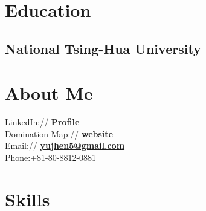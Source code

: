 \documentclass[letterpaper]{deedy-resume} %
\begin{document}


\begin{minipage}[t]{0.33\textwidth} %


\section{Education} 

\subsection{National Tsing-Hua University}


\sectionspace %


\section{About Me} 

LinkedIn:// \href{https://www.linkedin.com/in/yuzhen-xie-098704104/}{\bf Profile} \\
Domination Map:// \href{https://goo.gl/rJDLLf}{\bf website} \\
Email:// \href{mailto:yujhen5@gmail.com}{\bf yujhen5@gmail.com} \\
Phone:+81-80-8812-0881
\sectionspace %


\section{Skills}


\end{minipage}
\end{document}
